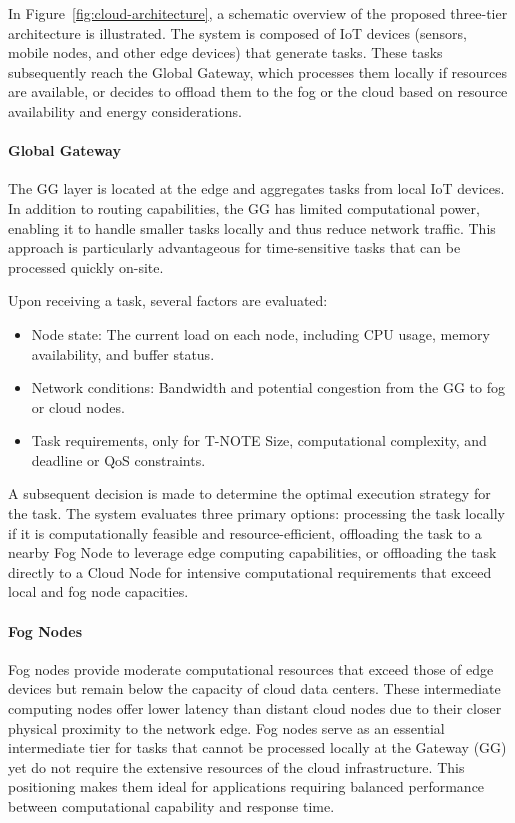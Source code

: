 \documentclass[preprint,3p,authoryear]{elsarticle}
\begin{document}
In Figure~\ref{fig:cloud-architecture}, a schematic overview of the proposed three-tier architecture is illustrated. The system is composed of IoT devices (sensors, mobile nodes, and other edge devices) that generate tasks. These tasks subsequently reach the Global Gateway, which processes them locally if resources are available, or decides to offload them to the fog or the cloud based on resource availability and energy considerations.

\paragraph{Global Gateway}\label{subsubsec:GG}

The GG layer is located at the edge and aggregates tasks from local IoT devices. In addition to routing capabilities, the GG has limited computational power, enabling it to handle smaller tasks locally and thus reduce network traffic. This approach is particularly advantageous for time-sensitive tasks that can be processed quickly on-site.

Upon receiving a task, several factors are evaluated:
\begin{itemize}
    \item Node state: The current load on each node, including CPU usage, memory availability, and buffer status.
    \item Network conditions: Bandwidth and potential congestion from the GG to fog or cloud nodes.
    \item Task requirements, only for T-NOTE\: Size, computational complexity, and deadline or QoS constraints.
\end{itemize}

A subsequent decision is made to determine the optimal execution strategy for the task. The system evaluates three primary options: processing the task locally if it is computationally feasible and resource-efficient, offloading the task to a nearby Fog Node to leverage edge computing capabilities, or offloading the task directly to a Cloud Node for intensive computational requirements that exceed local and fog node capacities.


\paragraph{Fog Nodes}\label{subsubsec:Fog}
Fog nodes provide moderate computational resources that exceed those of edge devices but remain below the capacity of cloud data centers. These intermediate computing nodes offer lower latency than distant cloud nodes due to their closer physical proximity to the network edge. Fog nodes serve as an essential intermediate tier for tasks that cannot be processed locally at the Gateway (GG) yet do not require the extensive resources of the cloud infrastructure. This positioning makes them ideal for applications requiring balanced performance between computational capability and response time.
\end{document}
